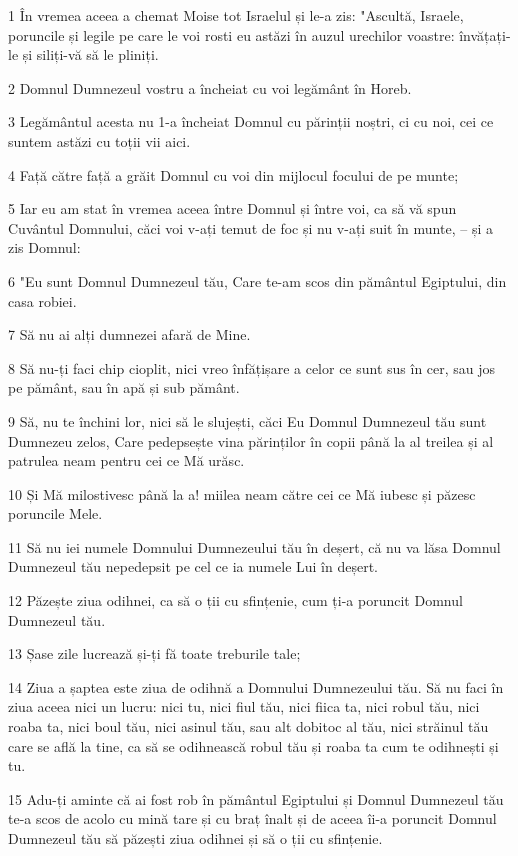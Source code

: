 \par 1 În vremea aceea a chemat Moise tot Israelul și le-a zis: "Ascultă, Israele, poruncile și legile pe care le voi rosti eu astăzi în auzul urechilor voastre: învățați-le și siliți-vă să le pliniți.
\par 2 Domnul Dumnezeul vostru a încheiat cu voi legământ în Horeb.
\par 3 Legământul acesta nu 1-a încheiat Domnul cu părinții noștri, ci cu noi, cei ce suntem astăzi cu toții vii aici.
\par 4 Față către față a grăit Domnul cu voi din mijlocul focului de pe munte;
\par 5 Iar eu am stat în vremea aceea între Domnul și între voi, ca să vă spun Cuvântul Domnului, căci voi v-ați temut de foc și nu v-ați suit în munte, -- și a zis Domnul:
\par 6 "Eu sunt Domnul Dumnezeul tău, Care te-am scos din pământul Egiptului, din casa robiei.
\par 7 Să nu ai alți dumnezei afară de Mine.
\par 8 Să nu-ți faci chip cioplit, nici vreo înfățișare a celor ce sunt sus în cer, sau jos pe pământ, sau în apă și sub pământ.
\par 9 Să, nu te închini lor, nici să le slujești, căci Eu Domnul Dumnezeul tău sunt Dumnezeu zelos, Care pedepsește vina părinților în copii până la al treilea și al patrulea neam pentru cei ce Mă urăsc.
\par 10 Și Mă milostivesc până la a! miilea neam către cei ce Mă iubesc și păzesc poruncile Mele.
\par 11 Să nu iei numele Domnului Dumnezeului tău în deșert, că nu va lăsa Domnul Dumnezeul tău nepedepsit pe cel ce ia numele Lui în deșert.
\par 12 Păzește ziua odihnei, ca să o ții cu sfințenie, cum ți-a poruncit Domnul Dumnezeul tău.
\par 13 Șase zile lucrează și-ți fă toate treburile tale;
\par 14 Ziua a șaptea este ziua de odihnă a Domnului Dumnezeului tău. Să nu faci în ziua aceea nici un lucru: nici tu, nici fiul tău, nici fiica ta, nici robul tău, nici roaba ta, nici boul tău, nici asinul tău, sau alt dobitoc al tău, nici străinul tău care se află la tine, ca să se odihnească robul tău și roaba ta cum te odihnești și tu.
\par 15 Adu-ți aminte că ai fost rob în pământul Egiptului și Domnul Dumnezeul tău te-a scos de acolo cu mină tare și cu braț înalt și de aceea îi-a poruncit Domnul Dumnezeul tău să păzești ziua odihnei și să o ții cu sfințenie.
